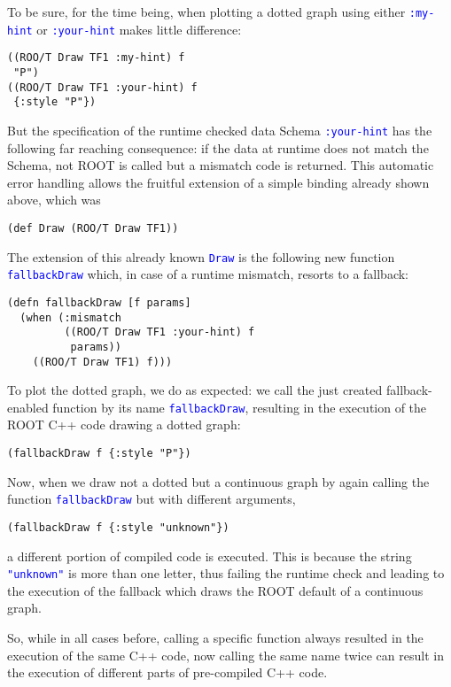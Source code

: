 \documentclass{IEEEcsmag}
\begin{document}
To be sure, for the time being, when plotting a dotted graph using either \texttt{\textcolor{blue}{:my-hint}} or \texttt{\textcolor{blue}{:your-hint}} makes little difference:
{\color{blue}\begin{verbatim}
((ROO/T Draw TF1 :my-hint) f
 "P")
((ROO/T Draw TF1 :your-hint) f
 {:style "P"})
\end{verbatim}}
But the specification of the runtime checked data Schema \texttt{\textcolor{blue}{:your-hint}} has the following far reaching consequence: if the data at runtime does not match the Schema, not ROOT is called but a mismatch code is returned. This automatic error handling allows the fruitful extension of a simple binding already shown above, which was
{\color{blue}\begin{verbatim}
(def Draw (ROO/T Draw TF1))
\end{verbatim}}
The extension of this already known \texttt{\textcolor{blue}{Draw}} is the following new function \texttt{\textcolor{blue}{fallbackDraw}} which, in case of a runtime mismatch, resorts to a fallback:
{\color{blue}\begin{verbatim}
(defn fallbackDraw [f params]
  (when (:mismatch
         ((ROO/T Draw TF1 :your-hint) f
          params))
    ((ROO/T Draw TF1) f)))
\end{verbatim}}
To plot the dotted graph, we do as expected: we call the just created fallback-enabled function by its name \texttt{\textcolor{blue}{fallbackDraw}}, resulting in the execution of the ROOT C++ code drawing a dotted graph:
{\color{blue}\begin{verbatim}
(fallbackDraw f {:style "P"})
\end{verbatim}}
Now, when we draw not a dotted but a continuous graph by again calling the function \texttt{\textcolor{blue}{fallbackDraw}} but with different arguments,
{\color{blue}\begin{verbatim}
(fallbackDraw f {:style "unknown"})
\end{verbatim}}
a different portion of compiled code is executed. This is because the string \texttt{\textcolor{blue}{"unknown"}} is more than one letter, thus failing the runtime check and leading to the execution of the fallback which draws the ROOT default of a continuous graph.

So, while in all cases before, calling a specific function always resulted in the execution of the same C++ code, now calling the same name twice can result in the execution of different parts of pre-compiled C++ code.
\end{document}
